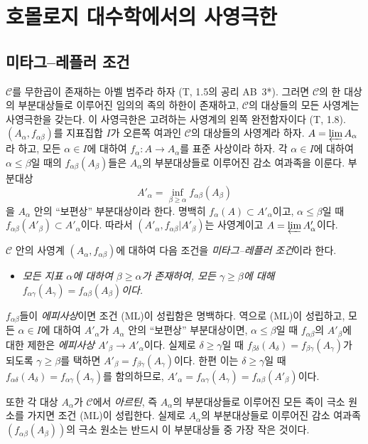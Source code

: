 \section{호몰로지 대수학에서의 사영극한}
\label{section:0.13-fr}

\subsection{미타그--레플러 조건}
\label{subsection:0.13.1-fr}

\begin{env}[13.1.1]
\label{0.13.1.1-fr}
$\mathcal C$를 무한곱이 존재하는 아벨 범주라 하자 (T, 1.5의 공리
AB~3*). 그러면 $\mathcal C$의 한 대상의 부분대상들로 이루어진 임의의
족의 하한이 존재하고, $\mathcal C$의 대상들의 모든 사영계는
사영극한을 갖는다. 이 사영극한은 고려하는 사영계의 왼쪽 완전함자이다
(T, 1.8). $(A_\alpha,f_{\alpha\beta})$를 지표집합 $I$가 오른쪽
여과인 $\mathcal C$의 대상들의 사영계라 하자.
$A=\varprojlim A_\alpha$라 하고, 모든 $\alpha\in I$에 대하여
$f_\alpha:A\to A_\alpha$를 표준 사상이라 하자. 각 $\alpha\in I$에
대하여 $\alpha\leq\beta$일 때의 $f_{\alpha\beta}(A_\beta)$들은
$A_\alpha$의 부분대상들로 이루어진 감소 여과족을 이룬다. 부분대상
\[
A'_\alpha=\inf_{\beta\geq\alpha}f_{\alpha\beta}(A_\beta)
\]
을 $A_\alpha$ 안의 ``보편상'' 부분대상이라 한다. 명백히
$f_\alpha(A)\subset A'_\alpha$이고, $\alpha\leq\beta$일 때
$f_{\alpha\beta}(A'_\beta)\subset A'_\alpha$이다. 따라서
$(A'_\alpha,f_{\alpha\beta}|A'_\beta)$는 사영계이고
$A=\varprojlim A'_\alpha$이다.
\end{env}

\begin{env}[13.1.2]
\label{0.13.1.2-fr}
$\mathcal C$ 안의 사영계 $(A_\alpha,f_{\alpha\beta})$에 대하여 다음
조건을 \emph{미타그--레플러 조건}이라 한다.
\begin{itemize}
\item[\textbf{(ML)}]
\emph{모든 지표 $\alpha$에 대하여 $\beta\geq\alpha$가 존재하여,
모든 $\gamma\geq\beta$에 대해
$f_{\alpha\gamma}(A_\gamma)=f_{\alpha\beta}(A_\beta)$이다.}
\end{itemize}
$f_{\alpha\beta}$들이 \emph{에피사상}이면 조건 (ML)이 성립함은
명백하다. 역으로 (ML)이 성립하고, 모든 $\alpha\in I$에 대하여
$A'_\alpha$가 $A_\alpha$ 안의 ``보편상'' 부분대상이면,
$\alpha\leq\beta$일 때 $f_{\alpha\beta}$의 $A'_\beta$에 대한 제한은
\emph{에피사상} $A'_\beta\to A'_\alpha$이다. 실제로
$\delta\geq\gamma$일 때
$f_{\beta\delta}(A_\delta)=f_{\beta\gamma}(A_\gamma)$가 되도록
$\gamma\geq\beta$를 택하면
$A'_\beta=f_{\beta\gamma}(A_\gamma)$이다. 한편 이는
$\delta\geq\gamma$일 때
$f_{\alpha\delta}(A_\delta)=f_{\alpha\gamma}(A_\gamma)$를 함의하므로,
$A'_\alpha=f_{\alpha\gamma}(A_\gamma)=f_{\alpha\beta}(A'_\beta)$이다.

또한 각 대상 $A_\alpha$가 $\mathcal C$에서 \emph{아르틴}, 즉
$A_\alpha$의 부분대상들로 이루어진 모든 족이 극소 원소를 가지면
조건 (ML)이 성립한다. 실제로 $A_\alpha$의 부분대상들로 이루어진
감소 여과족 $(f_{\alpha\beta}(A_\beta))$의 극소 원소는 반드시 이
부분대상들 중 가장 작은 것이다.
\end{env}

